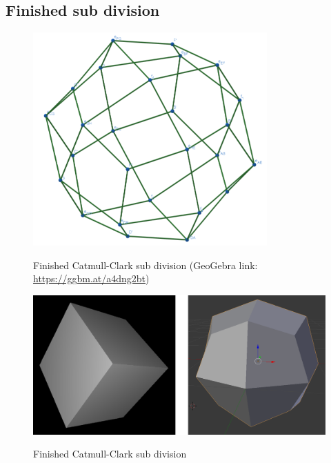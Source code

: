 \documentclass{article}
\begin{document}
\subsection{Finished sub division}
\begin{figure}[H]
\caption{Finished Catmull-Clark sub division (GeoGebra link: \href{https://ggbm.at/a4dng2bt}{https://ggbm.at/a4dng2bt})}
\centering
\includegraphics[width=0.8\textwidth]{images/cl-08.png}
\label{fig:cube8}
\end{figure}
\begin{figure}[H]
\caption{Finished Catmull-Clark sub division}
\centering
\includegraphics[width=1\textwidth]{images/cc-result.png}
\label{fig:cc-result}
\end{figure}
\end{document}
